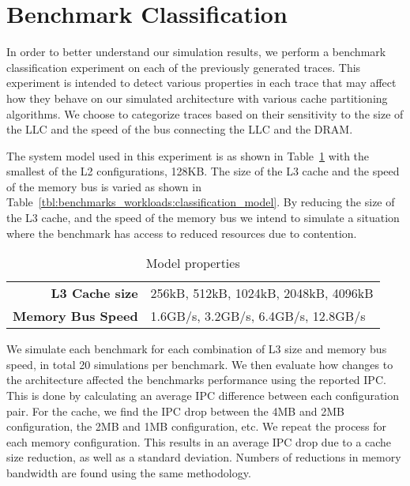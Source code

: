 \section{Benchmark Classification}



In order to better understand our simulation results, we perform a benchmark classification experiment on each of the previously generated traces.
This experiment is intended to detect various properties in each trace that may affect how they behave on our simulated architecture with various cache partitioning algorithms.
We choose to categorize traces based on their sensitivity to the size of the LLC and the speed of the bus connecting the LLC and the DRAM.

The system model used in this experiment is as shown in Table~\ref{tbl:processor_model:properties} with the smallest of the L2 configurations, 128KB.
The size of the L3 cache and the speed of the memory bus is varied as shown in Table~\ref{tbl:benchmarks_workloads:classification_model}.
By reducing the size of the L3 cache, and the speed of the memory bus we intend to simulate a situation where the benchmark has access to reduced resources due to contention. 

\begin{table}[ht]
\centering
\begin{tabular}{rl}
\toprule
\bf{L3 Cache size} & 256kB, 512kB, 1024kB, 2048kB, 4096kB \\
\bf{Memory Bus Speed}   & 1.6GB/s, 3.2GB/s, 6.4GB/s, 12.8GB/s \\
\bottomrule                             
\end{tabular}
\caption{Model properties}
\label{tbl:processor_model:properties}
\end{table}

We simulate each benchmark for each combination of L3 size and memory bus speed, in total 20 simulations per benchmark.
We then evaluate how changes to the architecture affected the benchmarks performance using the reported IPC.
This is done by calculating an average IPC difference between each configuration pair.
For the cache, we find the IPC drop between the 4MB and 2MB configuration, the 2MB and 1MB configuration, etc.
We repeat the process for each memory configuration.
This results in an average IPC drop due to a cache size reduction, as well as a standard deviation.
Numbers of reductions in memory bandwidth are found using the same methodology.


